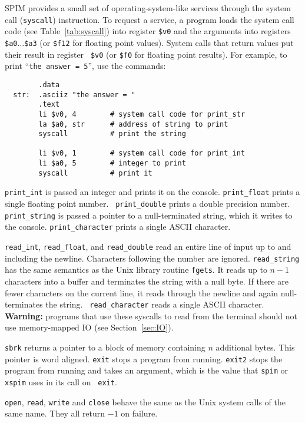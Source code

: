 \documentclass[11pt]{article}
\begin{document}
SPIM provides a small set of operating-system-like services through
the system call ({\tt syscall}) instruction.  To request a service, a
program loads the system call code (see Table~\ref{tab:syscall}) into
register {\tt \$v0} and the arguments into registers {\tt
\$a0}$\ldots${\tt \$a3} (or {\tt \$f12} for floating point values).
System calls that return values put their result in register {\tt
\$v0} (or {\tt \$f0} for floating point results).  For example, to
print ``{\tt the answer = 5}'', use the commands:
\begin{verbatim}
        .data
  str:  .asciiz "the answer = "
        .text
        li $v0, 4        # system call code for print_str
        la $a0, str      # address of string to print
        syscall          # print the string

        li $v0, 1        # system call code for print_int
        li $a0, 5        # integer to print
        syscall          # print it
\end{verbatim}

{\tt print\_int} is passed an integer and prints it on the console.
{\tt print\_float} prints a single floating point number. {\tt
print\_double} prints a double precision number.  {\tt print\_string}
is passed a pointer to a null-terminated string, which it writes to
the console. {\tt print\_character} prints a single ASCII character.

{\tt read\_int}, {\tt read\_float}, and {\tt read\_double} read an
entire line of input up to and including the newline.  Characters
following the number are ignored.  {\tt read\_string} has the same
semantics as the Unix library routine {\tt fgets}.  It reads up to
$n-1$ characters into a buffer and terminates the string with a null
byte.  If there are fewer characters on the current line, it reads
through the newline and again null-terminates the string.  {\tt
read\_character} reads a single ASCII character.  {\bf
Warning:} programs that use these syscalls to read from the terminal
should not use memory-mapped IO (see Section~\ref{sec:IO}).

{\tt sbrk} returns a pointer to a block of memory containing $n$ additional
bytes.  This pointer is word aligned. {\tt exit} stops a program from
running. {\tt exit2} stops the program from running and takes an argument,
which is the value that {\tt spim} or {\tt xspim} uses in its call on {\tt
exit}.

{\tt open}, {\tt read}, {\tt write} and {\tt close} behave the same as
the Unix system calls of the same name.  They all return $-1$ on
failure.
\end{document}
